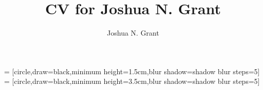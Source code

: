 \documentclass[10pt]{article}
\author{Joshua N. Grant}
\title{CV for Joshua N. Grant}
\begin{document}
 = [circle,draw=black,minimum height=1.5cm,blur shadow={shadow blur steps=5}]
 = [circle,draw=black,minimum height=3.5cm,blur shadow={shadow blur steps=5}]
\end{document}
